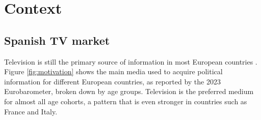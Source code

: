 \documentclass[12pt]{article}
\begin{document}
\section{Context} 

\label{section:context}


\subsection{Spanish TV market}

Television is still the primary source of information in most European countries \citep{europarl2024}. Figure \ref{fig:motivation} shows the main media used to acquire political information for different European countries, as reported by the 2023 Eurobarometer, broken down by age groups. Television is the preferred medium for almost all age cohorts, a pattern that is even stronger in countries such as France and Italy.
\end{document}
